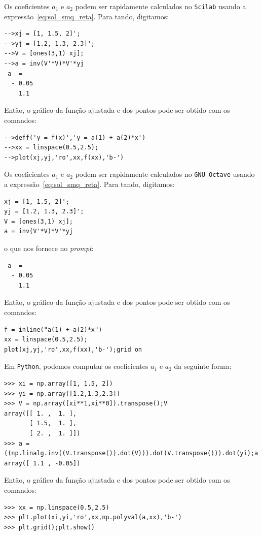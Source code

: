 \begin{sol}
\ifisscilab
Os coeficientes $a_1$ e $a_2$ podem ser rapidamente calculados no \verb+Scilab+ usando a expressão~\eqref{eq:sol_smq_reta}. Para tando, digitamos:
\begin{verbatim}
-->xj = [1, 1.5, 2]';
-->yj = [1.2, 1.3, 2.3]';
-->V = [ones(3,1) xj];
-->a = inv(V'*V)*V'*yj
 a  =
  - 0.05
    1.1
\end{verbatim}
Então, o gráfico da função ajustada e dos pontos pode ser obtido com os comandos:
\begin{verbatim}
-->deff('y = f(x)','y = a(1) + a(2)*x')
-->xx = linspace(0.5,2.5);
-->plot(xj,yj,'ro',xx,f(xx),'b-')
\end{verbatim}
\fi
\ifisoctave
Os coeficientes $a_1$ e $a_2$ podem ser rapidamente calculados no \verb+GNU Octave+ usando a expressão~\eqref{eq:sol_smq_reta}. Para tando, digitamos:
\begin{verbatim}
xj = [1, 1.5, 2]';
yj = [1.2, 1.3, 2.3]';
V = [ones(3,1) xj];
a = inv(V'*V)*V'*yj
\end{verbatim}
o que nos fornece no {\it prompt}:
\begin{verbatim}
 a  =
  - 0.05
    1.1
\end{verbatim}
Então, o gráfico da função ajustada e dos pontos pode ser obtido com os comandos:
\begin{verbatim}
f = inline("a(1) + a(2)*x")
xx = linspace(0.5,2.5);
plot(xj,yj,'ro',xx,f(xx),'b-');grid on
\end{verbatim}
\fi
\ifispython
Em \verb+Python+, podemos computar os coeficientes $a_1$ e $a_2$ da seguinte forma:
\begin{verbatim}
>>> xi = np.array([1, 1.5, 2])
>>> yi = np.array([1.2,1.3,2.3])
>>> V = np.array([xi**1,xi**0]).transpose();V
array([[ 1. ,  1. ],
       [ 1.5,  1. ],
       [ 2. ,  1. ]])
>>> a = ((np.linalg.inv((V.transpose()).dot(V))).dot(V.transpose())).dot(yi);a
array([ 1.1 , -0.05])
\end{verbatim}
Então, o gráfico da função ajustada e dos pontos pode ser obtido com os comandos:
\begin{verbatim}
>>> xx = np.linspace(0.5,2.5)
>>> plt.plot(xi,yi,'ro',xx,np.polyval(a,xx),'b-')
>>> plt.grid();plt.show()
\end{verbatim}
\fi

\end{sol}

